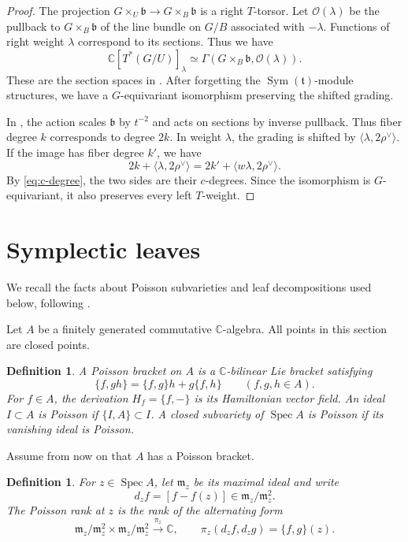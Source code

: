 \documentclass[12pt]{article}
\theoremstyle{paperplain}
\theoremstyle{paperdefinition}
\newtheorem{definition}[theorem]{Definition}
\DeclareMathOperator{\Spec}{Spec}
\DeclareMathOperator{\Sym}{Sym}
\newcommand{\C}{\mathbb C}
\newcommand{\tfrak}{\mathfrak t}
\begin{document}
\begin{proof}
    The projection $G\times_U\mathfrak b\to G\times_B\mathfrak b$ is a right $T$-torsor. Let $\mathcal O(\lambda)$ be the pullback to $G\times_B\mathfrak b$ of the line bundle on $G/B$ associated with $-\lambda$. Functions of right weight $\lambda$ correspond to its sections. Thus we have
    $$
        \C[T^*(G/U)]_\lambda
        \simeq\Gamma(G\times_B\mathfrak b,\mathcal O(\lambda)).
    $$
    These are the section spaces in \cite[(5.2.3)]{GinzburgRiche}. After forgetting the $\Sym(\tfrak)$-module structures, we have a $G$-equivariant isomorphism preserving the shifted grading.

    In \cite[Sections~1.10 and~2.4]{GinzburgRiche}, the action scales $\mathfrak b$ by $t^{-2}$ and acts on sections by inverse pullback. Thus fiber degree $k$ corresponds to degree $2k$. In weight $\lambda$, the grading is shifted by $\langle\lambda,2\rho^\vee\rangle$. If the image has fiber degree $k'$, we have
    $$
        2k+\langle\lambda,2\rho^\vee\rangle
        =2k'+\langle w\lambda,2\rho^\vee\rangle.
    $$
    By \eqref{eq:c-degree}, the two sides are their $c$-degrees. Since the isomorphism is $G$-equivariant, it also preserves every left $T$-weight.
\end{proof}


\vspace{2em}
\section{Symplectic leaves}\label{sec:leaves}

We recall the facts about Poisson subvarieties and leaf decompositions used below, following \cite{BrownGordon}.

Let $A$ be a finitely generated commutative $\C$-algebra. All points in this section are closed points.

\begin{definition}\label{def:poisson}
    A \emph{Poisson bracket} on $A$ is a $\C$-bilinear Lie bracket satisfying
    $$
        \{f,gh\}=\{f,g\}h+g\{f,h\}\qquad(f,g,h\in A).
    $$
    For $f\in A$, the derivation $H_f=\{f,-\}$ is its \emph{Hamiltonian vector field}. An ideal $I\subset A$ is \emph{Poisson} if $\{I,A\}\subset I$. A closed subvariety of $\Spec A$ is Poisson if its vanishing ideal is Poisson.
\end{definition}

Assume from now on that $A$ has a Poisson bracket.

\begin{definition}\label{def:poisson-rank}
    For $z\in\Spec A$, let $\mathfrak m_z$ be its maximal ideal and write
    $$
        d_zf=[f-f(z)]\in\mathfrak m_z/\mathfrak m_z^2.
    $$
    The \emph{Poisson rank} at $z$ is the rank of the alternating form
    $$
        \mathfrak m_z/\mathfrak m_z^2\times
        \mathfrak m_z/\mathfrak m_z^2\xrightarrow{\pi_z}\C,
        \qquad \pi_z(d_zf,d_zg)=\{f,g\}(z).
    $$
\end{definition}
\end{document}
